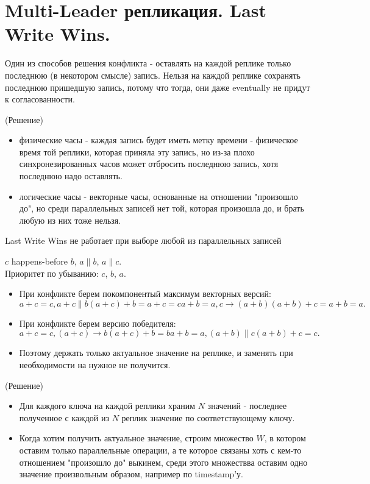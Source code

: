 \section{Multi-Leader репликация. Last Write Wins.}
    Один из способов решения конфликта - оставлять на каждой реплике только последнюю (в некотором смысле) запись. Нельзя на каждой реплике сохранять последнюю пришедшую запись, потому что тогда, они даже eventually не придут к согласованности. \\
    \begin{algorithm}(Решение)
    \begin{itemize}
        \item физические часы - каждая запись будет иметь метку времени - физическое время той реплики, которая приняла эту запись, но из-за плохо синхронезированных часов может отбросить последнюю запись, хотя последнюю надо оставлять.
        \item логические часы - векторные часы, основанные на отношении "произошло до", но среди параллельных записей нет той, которая произошла до, и брать любую из них тоже нельзя.
    \end{itemize}
    \end{algorithm}
      \begin{definition}
        Last Write Wins не работает при выборе любой из параллельных записей
      \end{definition}
          $c$ happens-before $b$, $a \parallel b$, $a \parallel c$. \\
          Приоритет по убыванию: $c$, $b$, $a$. \\
          \begin{itemize}
          \item При конфликте берем покомпонентый максимум векторных версий:
          \[
            a + c = c, a + c \parallel b
            (a + c) + b = a + c = c
            a + b = a, c \rightarrow (a + b)
            (a + b) + c = a + b = a
          .\]
          \item При конфликте берем версию победителя:
          \[
            a + c = c, (a + c) \rightarrow b
            (a + c) + b = b
            a + b = a, (a + b) \parallel c
            (a + b) + c = c
          .\]
         \item Поэтому держать только актуальное значение на реплике, и заменять при необходимости на нужное не получится.
        \end{itemize}
        \begin{algorithm}(Решение)
          \begin{itemize}
            \item Для каждого ключа на каждой реплики храним $N$ значений - последнее полученное с каждой из $N$ реплик значение по соответствующему ключу.
            \item Когда хотим получить актуальное значение, строим множество $W$, в котором оставим только параллельные операции, а те которое связаны хоть с кем-то отношением "произошло до" выкинем, среди этого множествва оставим одно значение произвольным образом, например по timestamp'у.
          \end{itemize}
        \end{algorithm}
